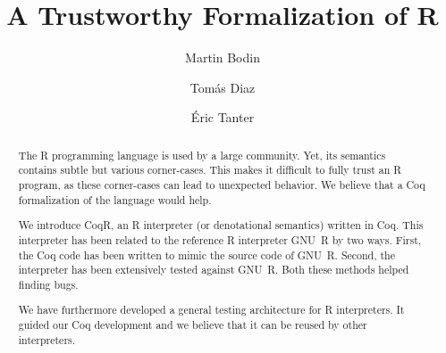 \documentclass[
    sigplan,
    10pt,
    review, %
    natbib=false %
 ]{acmart}
\newcommand\eti[1]{\todo[color=blue!20,inline]{#1}}
\newcommand\CoqR{CoqR}
\begin{document}
\title{A Trustworthy Formalization of R} %

\author{Martin Bodin}

\author{Tom{\'a}s Diaz}

\author{{\'E}ric Tanter}

\begin{abstract}
\eti{update when paper is stable:}

    The R programming language is used by a large community.
    Yet, its semantics contains subtle but various corner-cases.
    This makes it difficult to fully trust an R program,
    as these corner-cases can lead to unexpected behavior.
    We believe that a Coq formalization of the language would help.

    We introduce \CoqR{}, an R interpreter (or denotational semantics) written in Coq.
    This interpreter has been related to the reference R interpreter
    GNU~R by two ways.
    First, the Coq code has been written to mimic the source code of GNU~R.
    Second, the interpreter has been extensively tested against GNU~R.
    Both these methods helped finding bugs.

    We have furthermore developed a general testing architecture
    for R interpreters.
    It guided our Coq development
    and we believe that it can be reused by other interpreters.
\end{abstract}
\end{document}
